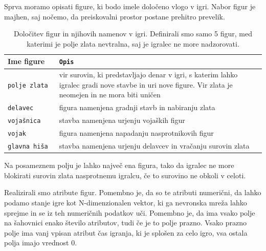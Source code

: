 \documentclass[a4paper, 12pt]{book}
\begin{document}
Sprva moramo opisati figure, ki bodo imele določeno vlogo v igri. Nabor figur je majhen, saj nočemo, da preiskovalni prostor postane prehitro prevelik.

\begin{table}
	\begin{center}
		\begin{tabular}{p{0.2\linewidth}|p{0.8\linewidth}}
			Ime figure        & {\tt Opis} \\ \hline
			{\tt polje zlata} & vir surovin, ki predstavljajo denar v igri, s katerim lahko igralec gradi nove stavbe in uri nove figure. 
								Vir zlata je neomejen in ne mora biti uničen \\
			{\tt delavec}     & figura namenjena gradnji stavb in nabiranju zlata \\
			{\tt vojašnica}   & stavba namenjena urjenju vojaških figur \\
			{\tt vojak}       & figura namenjena napadanju nasprotnikovih figur \\
			{\tt glavna hiša} & stavba namenjena urjenju delavcev in vračanju surovin zlata \\
		\end{tabular}
	\end{center}
	\caption{Določitev figur in njihovih namenov v igri. Definirali smo samo 5 figur, med katerimi je polje zlata nevtralna, saj je igralec ne more nadzorovati. }
	\label{tableFiguresDescription}
\end{table}

Na posameznem polju je lahko največ ena figura, tako da igralec ne more blokirati surovin zlata nasprotnemu igralcu, če to surovino ne obkoli v celoti.

Realizirali smo atribute figur. 
Pomembno je, da so te atributi numerični, da lahko podamo stanje igre kot N-dimenzionalen vektor, ki ga nevronska mreža lahko sprejme in se iz teh numeričnih podatkov uči.
Pomembno je, da ima vsako polje na šahovnici enako število atributov, tudi če je to polje prazno.
Vsako prazno polje ima vanj vpisan atribut čas igranja, ki je splošen za celo igro, vsa ostala polja imajo vrednost 0.
\end{document}

